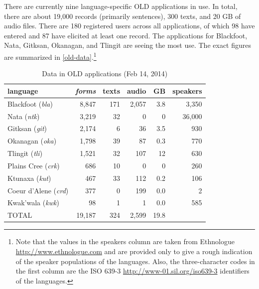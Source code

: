 \documentclass[11pt]{article}
\begin{document}

There are currently nine language-specific OLD applications in use. In total,
there are about 19,000  records (primarily sentences), 300 texts, and 20 GB 
of audio files.  There are 180 registered users across all applications, of
which 98 have entered and 87 have elicited at least one record. The applications
for Blackfoot, Nata, Gitksan, Okanagan, and Tlingit are seeing the most use. The
exact figures are summarized in \autoref{old-data}.\footnote{
Note that the values in the speakers column are taken from Ethnologue 
\url{http://www.ethnologue.com}  
and are provided only to give a rough indication of the speaker populations of
the languages. Also, the three-character codes in the first column are the ISO
639-3 
\url{http://www-01.sil.org/iso639-3} 
identifiers of the languages.}


\begin{table}[h]
 \begin{center}
     \scriptsize
\begin{tabular}{lrrrrr}

      \toprule
      language &                     \emph{forms}  & texts & audio & GB   & speakers \\
      \midrule
      Blackfoot (\textit{bla}) &     8,847  & 171   & 2,057 & 3.8  & 3,350    \\ %
      Nata (\textit{ntk}) &          3,219  & 32    & 0     & 0    & 36,000   \\ %
      Gitksan (\textit{git}) &       2,174  & 6     & 36    & 3.5  & 930      \\ %
      Okanagan (\textit{oka}) &      1,798  & 39    & 87    & 0.3  & 770      \\ %
      Tlingit (\textit{tli}) &       1,521  & 32    & 107   & 12   & 630      \\ %
      Plains Cree (\textit{crk}) &   686    & 10    & 0     & 0    & 260      \\ %
      Ktunaxa (\textit{kut}) &       467    & 33    & 112   & 0.2  & 106      \\ %
      Coeur d'Alene (\textit{crd}) & 377    & 0     & 199   & 0.0  & 2        \\ %
      Kwak'wala (\textit{kwk}) &     98     & 1     & 1     & 0.0  & 585      \\ %
      TOTAL &                        19,187 & 324   & 2,599 & 19.8 &         \\ %
      \bottomrule

\end{tabular}
\caption{Data in OLD applications (Feb 14, 2014)}
\label{old-data}
 \end{center}
 \normalsize
\end{table}
\end{document}
